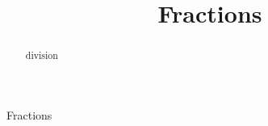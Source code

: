 \documentclass{ximera}
\title{Fractions}
\begin{document}
\begin{abstract}
division
\end{abstract}
\maketitle




Fractions
\end{document}
